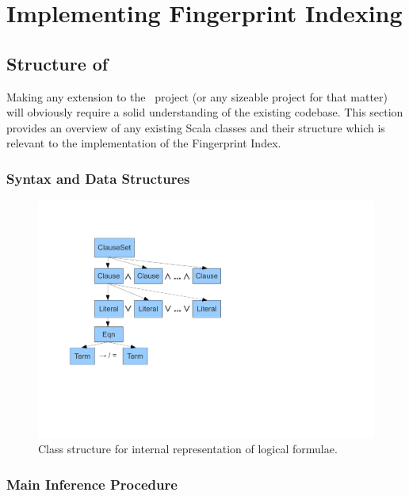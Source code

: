 
\chapter{Implementing Fingerprint Indexing}
\label{cha:method}

\section{Structure of \Beagle}
\label{sec:initial}

Making any extension to the \beagle\ project (or any sizeable project
for that matter) will obviously require a solid
understanding of the existing codebase. This section provides an overview
of any existing Scala classes and their structure which is relevant to the implementation of the Fingerprint Index.

\subsection{Syntax and Data Structures}

\begin{figure}[h]
  \centering
  \includegraphics[clip,trim=2.5cm 5cm 10cm 2cm,width=\textwidth]{resources/logicstructure}
  \caption
   {Class structure for internal representation of logical formulae.}
   \label{fig:expressions}
\end{figure}

\subsection{Main Inference Procedure}


